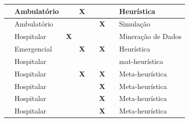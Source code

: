 \begin{quadro}[h]
{\begin{footnotesize}
\begin{tabular}{|M{2cm}|M{2cm}|M{1.5cm}|M{1.5cm}|M{1.5cm}|M{1.5cm}|M{1.8cm}|M{3cm}| }
				\hline
				                       & Ambulatório          &                                & \textbf{X}                   &            &            &            & Heurística                                                   \\
				\hline
				                & Ambulatório          &                                &                              &            & \textbf{X} &            & Simulação                                                    \\
				\hline
				                                          & Hospitalar           & \textbf{X}                     &                              &            &            &            & Mineração de Dados                                           \\
				\hline
				 & Emergencial          &                                & \textbf{X}                   &            & \textbf{X} &            & Heurística                                                   \\
				\hline
				                                        & Hospitalar           &                                &                              &            &            &            & mat-heurística                                                \\
				\hline
				                               & Hospitalar           &                                & \textbf{X}                   &            & \textbf{X} &            & Meta-heurística                                               \\
				\hline
				    & Hospitalar           &                                &                              &            & \textbf{X} &            & Meta-heurística                                               \\
				\hline
				                              & Hospitalar           &                                &                              &            & \textbf{X} &            & Meta-heurística                                               \\
				\hline
				    & Hospitalar           &                                &                              &            & \textbf{X} &            & Meta-heurística                                               \\

\end{tabular}
\end{footnotesize}}
\end{quadro}
